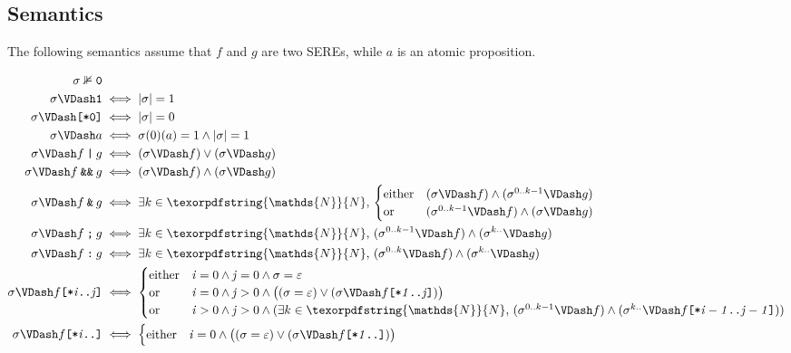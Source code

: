 \documentclass[a4paper,twoside,10pt,DIV=12]{scrreprt}
\newcommand{\N}{\texorpdfstring{\ensuremath{\mathds{N}}}{N}}
\newcommand{\OR}{\mathbin{\texttt{|}}}
\newcommand{\AND}{\mathbin{\texttt{\&}}}
\newcommand{\ANDALT}{\mathbin{\texttt{\&\&}}}
\newcommand{\FUSION}{\mathbin{\texttt{:}}}
\newcommand{\CONCAT}{\mathbin{\texttt{;}}}
\newcommand{\0}{\texttt{0}}
\newcommand{\1}{\texttt{1}}
\newcommand{\STAR}[1]{\texttt{[*#1]}}
\newcommand{\eword}{\texttt{[*0]}}
\newcommand\mvar[1]{\ensuremath{\mathit{#1}}}
\begin{document}
\subsection{Semantics}

The following semantics assume that $f$ and $g$ are two SEREs, while
$a$ is an atomic proposition.

{\allowdisplaybreaks
\begin{align*}
  \sigma\nVDash \0    &\\
  \sigma\VDash \1     & \iff |\sigma|=1\\
  \sigma\VDash \eword & \iff |\sigma|=0 \\
  \sigma\VDash a      & \iff \sigma(0)(a)=1 \land |\sigma|=1\\
  \sigma\VDash f\OR g &\iff (\sigma\VDash f) \lor (\sigma\VDash g) \\
  \sigma\VDash f\ANDALT g &\iff (\sigma \VDash f) \land (\sigma\VDash g) \\
  \sigma\VDash f\AND g &\iff \exists k\in\N,\,
  \begin{cases}
    \text{either} &(\sigma \VDash f) \land (\sigma^{0..k-1} \VDash g)\\
    \text{or} &(\sigma^{0..k-1} \VDash f) \land (\sigma \VDash g)
  \end{cases} \\
  \sigma\VDash f\CONCAT g&\iff \exists k\in\N,\,(\sigma^{0..k-1} \VDash f)\land(\sigma^{k..} \VDash g)\\
  \sigma\VDash f\FUSION g&\iff \exists k\in\N,\,(\sigma^{0..k} \VDash f)\land(\sigma^{k..} \VDash g)\\
  \sigma\VDash f\STAR{\mvar{i}..\mvar{j}}& \iff
  \begin{cases}
    \text{either} & \mvar{i}=0 \land\mvar{j}=0\land \sigma=\varepsilon \\
    \text{or} & \mvar{i}=0 \land \mvar{j}>0 \land \bigl((\sigma = \varepsilon) \lor (\sigma
      \VDash f\STAR{\mvar{1}..\mvar{j}})\bigr)\\
    \text{or} & \mvar{i}>0 \land \mvar{j}>0 \land (\exists k\in\N,\,
      (\sigma^{0..k-1}\VDash f) \land (\sigma^{k..}
      \VDash f\STAR{\mvar{i-1}..\mvar{j-1}}))\\
  \end{cases}\\
  \sigma\VDash f\STAR{\mvar{i}..} & \iff
  \begin{cases}
    \text{either} & \mvar{i}=0 \land \bigl((\sigma=\varepsilon)\lor(\sigma
      \VDash f\STAR{\mvar{1}..})\bigr)\\

\end{cases}
\end{align*}}
\end{document}
